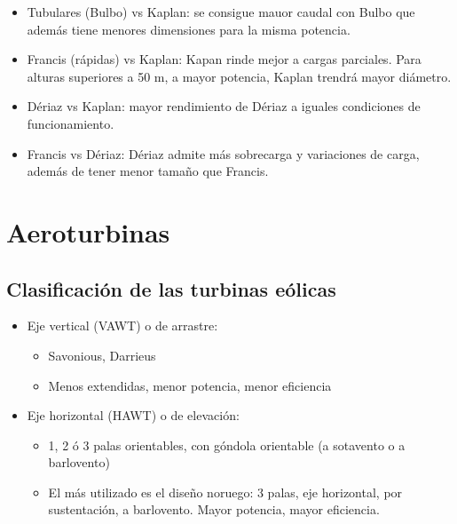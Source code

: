 \begin{itemize}
    \item Tubulares (Bulbo) vs Kaplan: se consigue mauor caudal con Bulbo que además tiene menores dimensiones para la misma potencia.
    \item Francis (rápidas) vs Kaplan: Kapan rinde mejor a cargas parciales. Para alturas superiores a 50 m, a mayor potencia, Kaplan trendrá mayor diámetro.
    \item Dériaz vs Kaplan: mayor rendimiento de Dériaz a iguales condiciones de funcionamiento.
    \item Francis vs Dériaz: Dériaz admite más sobrecarga y variaciones de carga, además de tener menor tamaño que Francis.
\end{itemize}

\begin{table}[H]
    \centering
\end{table}

\section{Aeroturbinas}
\subsection{Clasificación de las turbinas eólicas}
\begin{itemize}
    \item Eje vertical (VAWT) o de arrastre:
    \begin{itemize}
        \item Savonious, Darrieus
        \item Menos extendidas, menor potencia, menor eficiencia
    \end{itemize}
    \item Eje horizontal (HAWT) o de elevación:
    \begin{itemize}
        \item 1, 2 ó 3 palas orientables, con góndola orientable (a sotavento o a barlovento)
        \item El más utilizado es el diseño noruego: 3 palas, eje horizontal, por sustentación, a barlovento. Mayor potencia, mayor eficiencia.
    \end{itemize}
\end{itemize}

